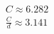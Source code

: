 \documentclass[preview]{standalone}
\begin{document}
\begin{align*}
C \approx 6.282 \\\frac{C}{d} \approx 3.141
\end{align*}
\end{document}
